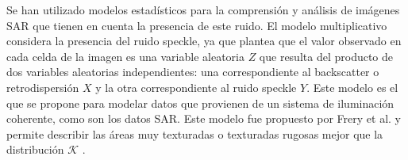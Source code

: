 Se han utilizado modelos estadísticos para la comprensión y análisis de imágenes SAR que tienen en cuenta la presencia de este ruido. El modelo multiplicativo considera la presencia del ruido speckle, ya que plantea que el valor observado en cada celda de la imagen es una variable aleatoria $Z$ que resulta del producto de dos variables aleatorias independientes: una correspondiente al backscatter o retrodispersión $X$ y la otra correspondiente al ruido speckle $Y$. Este modelo es el que se propone para modelar datos que provienen de un sistema de iluminación coherente, como son los datos SAR. Este modelo fue propuesto por Frery et al. \cite{Frery97} y permite describir las áreas muy texturadas o texturadas rugosas mejor que la distribución $\mathcal{K}$ \cite{jakeman87}.

%

